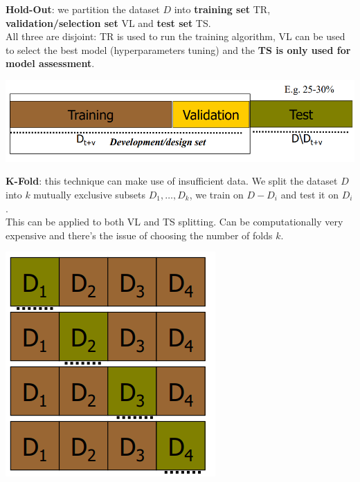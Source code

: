 \documentclass[10pt]{report}
\begin{document}
\begin{list}{}{}
	\item \textbf{Hold-Out}: we partition the dataset $D$ into \textbf{training set} TR, \textbf{validation/selection set} VL and \textbf{test set} TS.\\
	All three are disjoint: TR is used to run the training algorithm, VL can be used to select the best model (hyperparameters tuning) and the \textbf{TS is only used for model assessment}.
	\begin{center}
		\includegraphics[scale=0.5]{2.png}
	\end{center}
	\item \begin{multicols}{2}
	\textbf{K-Fold}: this technique can make use of insufficient data. We split the dataset $D$ into $k$ mutually exclusive subsets $D_1,\ldots, D_k$, we train on $D - D_i$ and test it on $D_i$.\\
	This can be applied to both VL and TS splitting. Can be computationally very expensive and there's the issue of choosing the number of folds $k$.
	\begin{center}
		\includegraphics[scale=0.5]{3.png}
	\end{center}
	\end{multicols}
\end{list}
\end{document}
